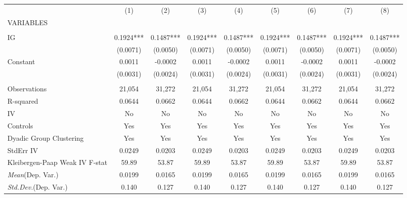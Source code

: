 \documentclass[]{article}
\begin{document}
\begin{tabular}{lcccccccc} \hline
 & (1) & (2) & (3) & (4) & (5) & (6) & (7) & (8) \\
VARIABLES &  &  &  &  &  &  &  &  \\ \hline
 &  &  &  &  &  &  &  &  \\
IG & 0.1924*** & 0.1487*** & 0.1924*** & 0.1487*** & 0.1924*** & 0.1487*** & 0.1924*** & 0.1487*** \\
 & (0.0071) & (0.0050) & (0.0071) & (0.0050) & (0.0071) & (0.0050) & (0.0071) & (0.0050) \\
Constant & 0.0011 & -0.0002 & 0.0011 & -0.0002 & 0.0011 & -0.0002 & 0.0011 & -0.0002 \\
 & (0.0031) & (0.0024) & (0.0031) & (0.0024) & (0.0031) & (0.0024) & (0.0031) & (0.0024) \\
 &  &  &  &  &  &  &  &  \\
Observations & 21,054 & 31,272 & 21,054 & 31,272 & 21,054 & 31,272 & 21,054 & 31,272 \\
R-squared & 0.0644 & 0.0662 & 0.0644 & 0.0662 & 0.0644 & 0.0662 & 0.0644 & 0.0662 \\
IV & No & No & No & No & No & No & No & No \\
Controls & Yes & Yes & Yes & Yes & Yes & Yes & Yes & Yes \\
Dyadic Group Clustering & Yes & Yes & Yes & Yes & Yes & Yes & Yes & Yes \\
StdErr IV & 0.0249 & 0.0203 & 0.0249 & 0.0203 & 0.0249 & 0.0203 & 0.0249 & 0.0203 \\
Kleibergen-Paap Weak IV F-stat & 59.89 & 53.87 & 59.89 & 53.87 & 59.89 & 53.87 & 59.89 & 53.87 \\
\textit{Mean}(Dep. Var.) & 0.0199 & 0.0165 & 0.0199 & 0.0165 & 0.0199 & 0.0165 & 0.0199 & 0.0165 \\
 \textit{Std.Dev.}(Dep. Var.) & 0.140 & 0.127 & 0.140 & 0.127 & 0.140 & 0.127 & 0.140 & 0.127 \\ \hline
\end{tabular}
\end{document}
